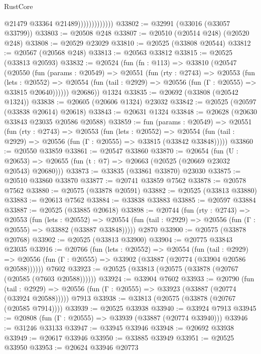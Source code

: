 \begin{lexlean}{RustCore}
\begin{coremodule}
                              @21479
                              @33364
                              @21489)))))))))))))
@33802 := @32991 (@33016 (@33057 @33799))
@33803 := @20508 @248
@33807 := @20510 (@20514 @248) (@20520 @248)
@33808 := @20529 @23029
@33810 := @20525 (@33808 @20544)
@33812 := @20567 (@20568 @248)
@33813 := @20563 @33812
@33815 := @20525 (@33813 @20593)
@33832 := @20524
    (fun (fn : @113) =>
    @33810
      (@20547
        (@20550
          (fun (params : @20549) =>
          @20551
            (fun (rty : @2743) =>
            @20553
              (fun (lets : @20552) =>
              @20554 (fun (tail : @2929) => @20556 (fun (Γ : @20555) => @33815 @20640))))))
        @20686))
    @1324
@33835 := @20692 (@33808 (@20542 @1324))
@33838 := @20605 (@20606 @1324) @23032
@33842 := @20525 (@20597 (@33838 @20614) @20618)
@33843 := @20631 @1324
@33848 := @20628 (@20630 @33843 @23035 @20586 @20588)
@33859 := fun (params : @20549) =>
  @20551
    (fun (rty : @2743) =>
    @20553
      (fun (lets : @20552) =>
      @20554 (fun (tail : @2929) => @20556 (fun (Γ : @20555) => @33815 (@33842 @33848)))))
@33860 := @20550 @33859
@33861 := @20547 @33860
@33870 := @20654
    (fun (U : @20653) => @20655 (fun (t : @7) => @20663 (@20525 (@20669 @23032 @20543) @20680)))
@33873 := @33835 (@33861 @33870) @23030
@33875 := @20510 @33860 @33870
@33877 := @20741 @33859 @7562
@33878 := @20578 @7562
@33880 := @20575 (@33878 @20591)
@33882 := @20525 (@33813 @33880)
@33883 := @20613 @7562
@33884 := @33838 @33883
@33885 := @20597 @33884
@33887 := @20525 (@33885 @20618)
@33898 := @20744
    (fun (rty : @2743) =>
    @20553
      (fun (lets : @20552) =>
      @20554 (fun (tail : @2929) => @20556 (fun (Γ : @20555) => @33882 (@33887 @33848)))))
    @2870
@33900 := @20575 (@33878 @20768)
@33902 := @20525 (@33813 @33900)
@33904 := @20775 @33843 @23035
@33916 := @20766
    (fun (lets : @20552) =>
    @20554
      (fun (tail : @2929) =>
      @20556 (fun (Γ : @20555) => @33902 (@33887 (@20774 (@33904 @20586 @20588))))))
    @7602
@33923 := @20525 (@33813 (@20575 (@33878 (@20767 (@20585 (@7603 @20588))))))
@33924 := @33904 @7602
@33933 := @20790
    (fun (tail : @2929) => @20556 (fun (Γ : @20555) => @33923 (@33887 (@20774 (@33924 @20588)))))
    @7913
@33938 := @33813 (@20575 (@33878 (@20767 (@20585 @7914))))
@33939 := @20525 @33938
@33940 := @33924 @7913
@33945 := @20808 (fun (Γ : @20555) => @33939 (@33887 (@20774 @33940)))
@33946 := @31246 @33133
@33947 := @33945 @33946
@33948 := @20692 @33938
@33949 := @20617 @33946
@33950 := @33885 @33949
@33951 := @20525 @33950
@33953 := @20624 @33946 @20773

\end{coremodule}
\end{lexlean}
